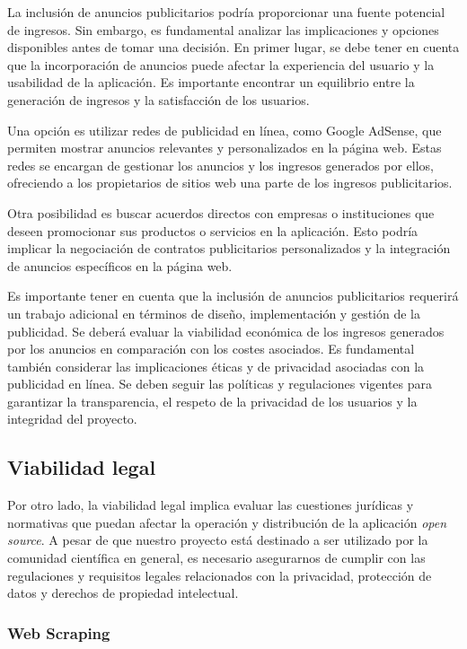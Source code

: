 La inclusión de anuncios publicitarios podría proporcionar una fuente potencial de ingresos. Sin embargo, es fundamental analizar las implicaciones y opciones disponibles antes de tomar una decisión. En primer lugar, se debe tener en cuenta que la incorporación de anuncios puede afectar la experiencia del usuario y la usabilidad de la aplicación. Es importante encontrar un equilibrio entre la generación de ingresos y la satisfacción de los usuarios.

Una opción es utilizar redes de publicidad en línea, como Google AdSense, que permiten mostrar anuncios relevantes y personalizados en la página web. Estas redes se encargan de gestionar los anuncios y los ingresos generados por ellos, ofreciendo a los propietarios de sitios web una parte de los ingresos publicitarios.

Otra posibilidad es buscar acuerdos directos con empresas o instituciones que deseen promocionar sus productos o servicios en la aplicación. Esto podría implicar la negociación de contratos publicitarios personalizados y la integración de anuncios específicos en la página web.

Es importante tener en cuenta que la inclusión de anuncios publicitarios requerirá un trabajo adicional en términos de diseño, implementación y gestión de la publicidad. Se deberá evaluar la viabilidad económica de los ingresos generados por los anuncios en comparación con los costes asociados. Es fundamental también considerar las implicaciones éticas y de privacidad asociadas con la publicidad en línea. Se deben seguir las políticas y regulaciones vigentes para garantizar la transparencia, el respeto de la privacidad de los usuarios y la integridad del proyecto.

\subsection{Viabilidad legal}
\label{sec:Viabilidad legal}
Por otro lado, la viabilidad legal implica evaluar las cuestiones jurídicas y normativas que puedan afectar la operación y distribución de la aplicación \textit{open source}. A pesar de que nuestro proyecto está destinado a ser utilizado por la comunidad científica en general, es necesario asegurarnos de cumplir con las regulaciones y requisitos legales relacionados con la privacidad, protección de datos y derechos de propiedad intelectual.

\subsubsection{Web Scraping}

